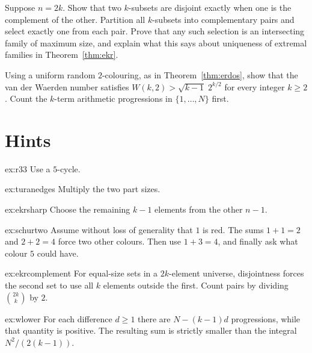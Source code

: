 \begin{exercise}[$\star\star$]\label{ex:ekrcomplement}
Suppose $n=2k$. Show that two $k$-subsets are disjoint exactly when one is the complement of the other. Partition all $k$-subsets into complementary pairs and select exactly one from each pair. Prove that any such selection is an intersecting family of maximum size, and explain what this says about uniqueness of extremal families in Theorem~\ref{thm:ekr}.
\end{exercise}


\begin{exercise}[$\star$]\label{ex:wlower}
Using a uniform random $2$-colouring, as in Theorem~\ref{thm:erdos}, show that the van der Waerden number satisfies $W(k,2)>\sqrt{k-1}\;2^{k/2}$ for every integer $k\ge2$. Count the $k$-term arithmetic progressions in $\{1,\ldots,N\}$ first.
\end{exercise}

\section{Hints}

\begin{hint}{ex:r33}
Use a $5$-cycle.
\end{hint}
\begin{hint}{ex:turanedges}
Multiply the two part sizes.
\end{hint}
\begin{hint}{ex:ekrsharp}
Choose the remaining $k-1$ elements from the other $n-1$.
\end{hint}

\begin{hint}{ex:schurtwo}
Assume without loss of generality that $1$ is red. The sums $1+1=2$ and $2+2=4$ force two other colours. Then use $1+3=4$, and finally ask what colour $5$ could have.
\end{hint}

\begin{hint}{ex:ekrcomplement}
For equal-size sets in a $2k$-element universe, disjointness forces the second set to use all $k$ elements outside the first. Count pairs by dividing $\binom{2k}{k}$ by $2$.
\end{hint}


\begin{hint}{ex:wlower}
For each difference $d\ge1$ there are $N-(k-1)d$ progressions, while that quantity is positive. The resulting sum is strictly smaller than the integral $N^2/(2(k-1))$.
\end{hint}

